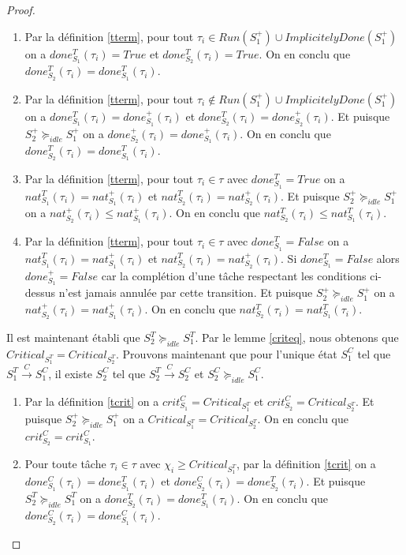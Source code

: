 \documentclass[a4paper]{report}
\theoremstyle{break}
\theoremstyle{breakplain}
\begin{document}
\begin{proof}
\begin{enumerate}
\item Par la définition \ref{tterm}, pour tout $\tau_i \in Run(S_1^+) \cup ImplicitelyDone(S_1^+)$ on a $done_{S_1}^T(\tau_i) = True$ et $done_{S_2}^T(\tau_i) = True$. On en conclu que $done_{S_2}^T(\tau_i) = done_{S_1}^T(\tau_i)$.
\item Par la définition \ref{tterm}, pour tout $\tau_i \notin Run(S_1^+) \cup ImplicitelyDone(S_1^+)$ on a $done_{S_1}^T(\tau_i) = done_{S_1}^+(\tau_i)$ et $done_{S_2}^T(\tau_i) = done_{S_2}^+(\tau_i)$. Et puisque $S^+_2 \succeq_{idle} S^+_1$ on a $done_{S_2}^+(\tau_i)= done_{S_1}^+(\tau_i)$. On en conclu que $done_{S_2}^T(\tau_i) = done_{S_1}^T(\tau_i)$.
\item Par la définition \ref{tterm}, pour tout $\tau_i \in \tau$ avec $done_{S_1}^T = True$ on a $nat_{S_1}^T(\tau_i) = nat_{S_1}^+(\tau_i)$ et $nat_{S_2}^T(\tau_i) = nat_{S_2}^+(\tau_i)$. Et puisque $S^+_2 \succeq_{idle} S^+_1$ on a $nat_{S_2}^+(\tau_i)\leq nat_{S_1}^+(\tau_i)$. On en conclu que $nat_{S_2}^T(\tau_i) \leq nat_{S_1}^T(\tau_i)$.
\item Par la définition \ref{tterm}, pour tout $\tau_i \in \tau$ avec $done_{S_1}^T = False$ on a $nat_{S_1}^T(\tau_i) = nat_{S_1}^+(\tau_i)$ et $nat_{S_2}^T(\tau_i) = nat_{S_2}^+(\tau_i)$. Si $done^T_{S_1} = False$ alors $done^+_{S_1} = False$ car la complétion d'une tâche respectant les conditions ci-dessus n'est jamais annulée par cette transition. Et puisque $S^+_2 \succeq_{idle} S^+_1$ on a $nat_{S_2}^+(\tau_i)= nat_{S_1}^+(\tau_i)$. On en conclu que $nat_{S_2}^T(\tau_i) = nat_{S_1}^T(\tau_i)$.
\end{enumerate}

Il est maintenant établi que $S^T_2 \succeq_{idle} S^T_1$. Par le lemme \ref{criteq}, nous obtenons que $Critical_{S_1^T} = Critical_{S_2^T}$. Prouvons maintenant que pour l'unique état $S_1^C$ tel que $S^{T}_1\xrightarrow{C}S^{C}_1$, il existe $S_2^C$ tel que $S^{T}_2\xrightarrow{C}S^{C}_2$ et $S^C_2 \succeq_{idle} S^C_1$.

\begin{enumerate}

\item Par la définition \ref{tcrit} on a $crit_{S_1}^C = Critical_{S_1^T}$ et $crit_{S_2}^C = Critical_{S_2^T}$. Et puisque $S^+_2 \succeq_{idle} S^+_1$ on a $Critical_{S_1^T} = Critical_{S_2^T}$. On en conclu que $crit_{S_2}^C= crit_{S_1}^C$.


\item Pour toute tâche $\tau_i \in \tau$ avec $\chi_i \geq Critical_{S_1^T}$, par la définition \ref{tcrit} on a $done_{S_1}^C(\tau_i) = done_{S_1}^T(\tau_i)$ et $done_{S_2}^C(\tau_i) = done_{S_2}^T(\tau_i)$. Et puisque $S^T_2 \succeq_{idle} S^T_1$ on a $done_{S_2}^T(\tau_i)= done_{S_1}^T(\tau_i)$. On en conclu que $done_{S_2}^C(\tau_i) = done_{S_1}^C(\tau_i)$.


\end{enumerate}
\end{proof}
\end{document}

